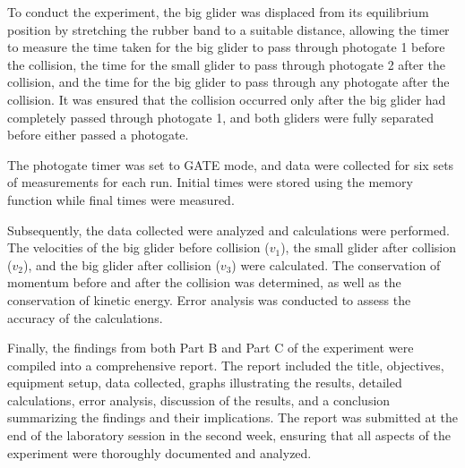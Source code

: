 \documentclass[a4paper,11pt]{article}
\begin{document}
To conduct the experiment, the big glider was displaced from its equilibrium position by stretching the rubber band to a suitable distance, allowing the timer to measure the time taken for the big glider to pass through photogate 1 before the collision, the time for the small glider to pass through photogate 2 after the collision, and the time for the big glider to pass through any photogate after the collision. It was ensured that the collision occurred only after the big glider had completely passed through photogate 1, and both gliders were fully separated before either passed a photogate.

The photogate timer was set to GATE mode, and data were collected for six sets of measurements for each run. Initial times were stored using the memory function while final times were measured.

Subsequently, the data collected were analyzed and calculations were performed. The velocities of the big glider before collision (\(v_1\)), the small glider after collision (\(v_2\)), and the big glider after collision (\(v_3\)) were calculated. The conservation of momentum before and after the collision was determined, as well as the conservation of kinetic energy. Error analysis was conducted to assess the accuracy of the calculations.

Finally, the findings from both Part B and Part C of the experiment were compiled into a comprehensive report. The report included the title, objectives, equipment setup, data collected, graphs illustrating the results, detailed calculations, error analysis, discussion of the results, and a conclusion summarizing the findings and their implications. The report was submitted at the end of the laboratory session in the second week, ensuring that all aspects of the experiment were thoroughly documented and analyzed.

\newpage
{}
\end{document}

